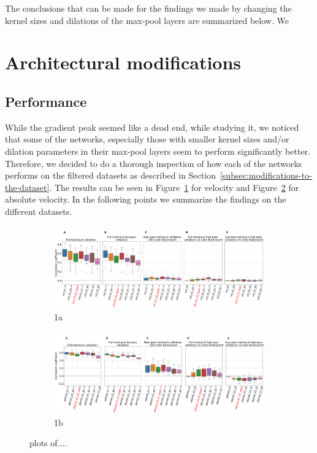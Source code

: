 The conclusions that can be made for the findings we made by changing the kernel sizes and dilations of the max-pool layers are summarized below.
We
\section{Architectural modifications}\label{sec:architectural-modifications}
\subsection{Performance}\label{subsec:performance}
While the gradient peak seemed like a dead end, while studying it, we noticed that some of the networks, especially those with smaller kernel sizes and/or dilation parameters in their max-pool layers seem to perform significantly better.
Therefore, we decided to do a thorough inspection of how each of the networks performs on the filtered datasets as described in Section~\ref{subsec:modifications-to-the-dataset}.
The results can be seen in Figure~\ref{fig:original-performances-velocity} for velocity and Figure~\ref{fig:original-performances-absolute-velocity} for absolute velocity.
In the following points we summarize the findings on the different datasets.
\begin{figure}
\begin{subfigure}{.5\textwidth}
  \centering
  \includegraphics[width=.8\linewidth]{img/ch4/original_setting_vel_performance_comparison}
  \caption{1a}
  \label{fig:original-performances-velocity}
\end{subfigure}%
\begin{subfigure}{.5\textwidth}
  \centering
  \includegraphics[width=.8\linewidth]{img/ch4/original_setting_absVel_performance_comparison}
  \caption{1b}
  \label{fig:original-performances-absolute-velocity}
\end{subfigure}
\caption{plots of....}
\label{fig:original-performances}
\end{figure}

